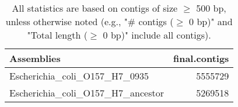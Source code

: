 \documentclass[12pt,a4paper]{article}
\begin{document}
\begin{table}[ht]
\begin{center}
\caption{All statistics are based on contigs of size $\geq$ 500 bp, unless otherwise noted (e.g., "\# contigs ($\geq$ 0 bp)" and "Total length ($\geq$ 0 bp)" include all contigs).}
\begin{tabular}{|l*{1}{|r}|}
\hline
Assemblies & final.contigs \\ \hline
Escherichia\_coli\_O157\_H7\_0935 & 5555729 \\ \hline
Escherichia\_coli\_O157\_H7\_ancestor & 5269518 \\ \hline
\end{tabular}
\end{center}
\end{table}
\end{document}
